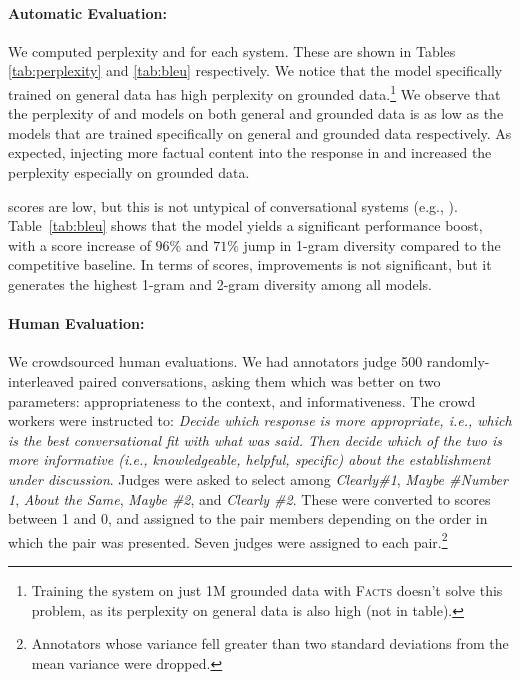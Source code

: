 \documentclass[letterpaper]{article}
\begin{document}
\paragraph{Automatic Evaluation:}
We computed perplexity and \bleu \cite{Papineni2002BLEU} for each system. These are shown in Tables \ref{tab:perplexity} and \ref{tab:bleu} respectively. We notice that the \sts model specifically trained on general data has high perplexity on grounded data.\footnote{Training the system on just 1M grounded data with \textsc{Facts} doesn't solve this problem, as its perplexity on general data is also high (not in table).}
We observe that the perplexity of \MTask and \MTaskR models on both general and grounded data is as low as the \sts models that are trained specifically on general and grounded data respectively. As expected, injecting more factual content into the response in  \MTaskF and \MTaskRF increased the perplexity especially on grounded data. 

\bleu scores are low, but this is not untypical of conversational systems (e.g., \cite{li2016diversity,li2016persona}). Table~\ref{tab:bleu} shows that the \MTaskR model yields
a significant performance boost, with a \bleu score increase of $96\%$ and $71\%$ jump in 1-gram diversity compared to the competitive \sts baseline. In terms of \bleu scores, \MTaskRF improvements is not significant, but it generates the highest 1-gram and 2-gram diversity among all models.

\paragraph{Human Evaluation:} We crowdsourced human evaluations. We had annotators judge 500 randomly-interleaved paired conversations, asking them which was better on two parameters: appropriateness to the  context, and informativeness. The crowd workers were instructed to: \textit{Decide which response is more appropriate, i.e., which is the best conversational fit with what was said. Then decide which of the two is more informative (i.e., knowledgeable, helpful, specific) about the establishment under discussion}. 
Judges were asked to select among \textit{Clearly{\#}1}, \textit{Maybe {\#}Number 1}, \textit{About the Same}, \textit{Maybe {\#}2}, and \textit{Clearly {\#}2}. These were converted to scores between 1 and 0, and assigned to the pair members depending on the order in which the pair was presented.
Seven judges were assigned to each pair.\footnote{Annotators whose variance fell greater than two standard deviations from the mean variance were dropped.}
\end{document}
